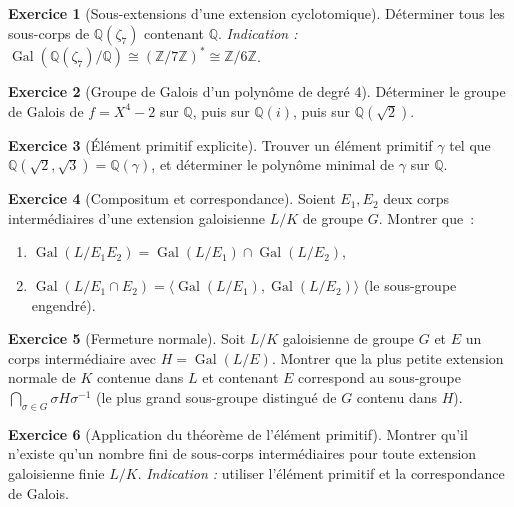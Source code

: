 \documentclass[12pt,a4paper,openany]{book}
\theoremstyle{definition}
\newtheorem{exercice}{Exercice}[chapter]
\newcommand{\Z}{\mathbb{Z}}
\newcommand{\Q}{\mathbb{Q}}
\newcommand{\Gal}{\operatorname{Gal}}
\begin{document}
\begin{exercice}[Sous-extensions d'une extension cyclotomique]\label{exo:sous-ext-cyclotomique}
Déterminer tous les sous-corps de $\Q(\zeta_7)$ contenant $\Q$.
\emph{Indication :} $\Gal(\Q(\zeta_7)/\Q) \cong (\Z/7\Z)^* \cong \Z/6\Z$.
\end{exercice}

\begin{exercice}[Groupe de Galois d'un polynôme de degré 4]\label{exo:galois-degre-4}
Déterminer le groupe de Galois de $f = X^4 - 2$ sur $\Q$, puis sur
$\Q(i)$, puis sur $\Q(\sqrt{2})$.
\end{exercice}

\begin{exercice}[Élément primitif explicite]\label{exo:element-primitif-explicite}
Trouver un élément primitif $\gamma$ tel que
$\Q(\sqrt{2},\sqrt{3}) = \Q(\gamma)$, et déterminer le polynôme minimal
de $\gamma$ sur $\Q$.
\end{exercice}

\begin{exercice}[Compositum et correspondance]\label{exo:compositum-correspondance}
Soient $E_1, E_2$ deux corps intermédiaires d'une extension galoisienne
$L/K$ de groupe $G$. Montrer que~:
\begin{enumerate}[label=(\alph*)]
  \item $\Gal(L/E_1 E_2) = \Gal(L/E_1) \cap \Gal(L/E_2)$,
  \item $\Gal(L/E_1 \cap E_2) = \langle \Gal(L/E_1), \Gal(L/E_2)\rangle$
    (le sous-groupe engendré).
\end{enumerate}
\end{exercice}

\begin{exercice}[Fermeture normale]\label{exo:fermeture-normale-correspondance}
Soit $L/K$ galoisienne de groupe $G$ et $E$ un corps intermédiaire avec
$H = \Gal(L/E)$. Montrer que la plus petite extension normale de $K$
contenue dans $L$ et contenant $E$ correspond au sous-groupe
$\bigcap_{\sigma \in G} \sigma H \sigma^{-1}$ (le plus grand sous-groupe
distingué de $G$ contenu dans $H$).
\end{exercice}

\begin{exercice}[Application du théorème de l'élément primitif]\label{exo:application-element-primitif}
Montrer qu'il n'existe qu'un nombre fini de sous-corps intermédiaires
pour toute extension galoisienne finie $L/K$.
\emph{Indication :} utiliser l'élément primitif et la correspondance de Galois.
\end{exercice}
\end{document}
